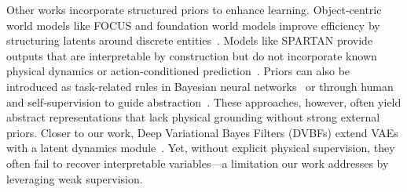 \documentclass[sigconf]{acmart}
\begin{document}
Other works incorporate structured priors to enhance learning. Object-centric world models like FOCUS and foundation world models improve efficiency by structuring latents around discrete entities~\cite[]{ferraro2023focus, mao2024zero}. Models like SPARTAN provide outputs that are interpretable by construction but do not incorporate known physical dynamics or action-conditioned prediction~\cite[]{lei2024spartan}. Priors can also be introduced as task-related rules in Bayesian neural networks~\cite[]{sam2024bayesian} or through human and self-supervision to guide abstraction~\cite[]{fu2021learning, wen2023any, konidaris2018skills, peng2024human, chen2022automated}. These approaches, however, often yield abstract representations that lack physical grounding without strong external priors. Closer to our work, Deep Variational Bayes Filters (DVBFs) extend VAEs with a latent dynamics module~\cite[]{karl2016deep}. Yet, without explicit physical supervision, they often fail to recover interpretable variables—a limitation our work addresses by leveraging weak supervision.
\end{document}
